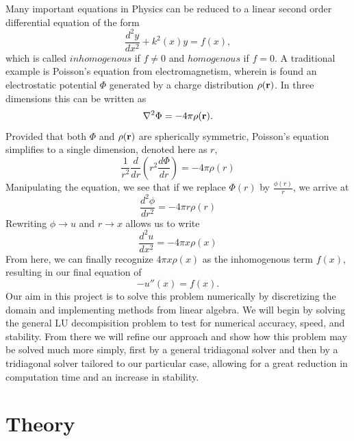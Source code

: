 \documentclass[11pt,a4paper]{article}
\begin{document}
Many important equations in Physics can be reduced to a linear second order differential equation of the form
\[
\frac{d^2y}{dx^2} + k^2(x)y = f(x),
\]
which is called $inhomogenous$ if $f \neq 0$ and $homogenous$ if $f = 0$. 
A traditional example is Poisson's equation from electromagnetism, wherein is found an electrostatic potential $\Phi$ generated by a charge distribution $\rho (\bf{r})$. In three dimensions this can be written as
\[
\nabla^2\Phi = -4\pi\rho(\bf{r}).
\]
Provided that both $\Phi$ and $\rho(\bf{r})$ are spherically symmetric, Poisson's equation simplifies to a single dimension, denoted here as $r$,
\[
\frac{1}{r^2}\frac{d}{dr}(r^2\frac{d\Phi}{dr}) = -4\pi\rho(r)
\]
Manipulating the equation, we see that if we replace $\Phi(r)$ by $\frac{\phi(r)}{r}$, we arrive at
\[
\frac{d^2\phi}{dr^2} = -4\pi r\rho(r)
\]
Rewriting $\phi\rightarrow u$ and $r\rightarrow x$ allows us to write
\[
\frac{d^2u}{dx^2} = -4\pi x \rho (x)
\]
From here, we can finally recognize $4\pi x \rho(x)$ as the inhomogenous term $f(x)$, resulting in our final equation of
\[
-u''(x) = f(x).
\]
Our aim in this project is to solve this problem numerically by discretizing the domain and implementing methods from linear algebra. We will begin by solving the general LU decompisition problem to test for numerical accuracy, speed, and stability. From there we will refine our approach and show how this problem may be solved much more simply, first by a general tridiagonal solver and then by a tridiagonal solver tailored to our particular case, allowing for a great reduction in computation time and an increase in stability.

\section{Theory}
\end{document}
